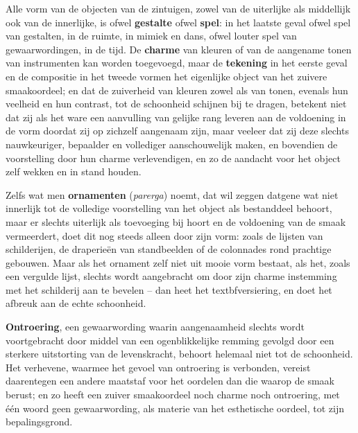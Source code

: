Alle vorm van de objecten van de zintuigen, zowel van de uiterlijke als middellijk ook van de innerlijke, is ofwel \textbf{gestalte} ofwel \textbf{spel}: in het laatste geval ofwel spel van gestalten, in de ruimte, in mimiek en dans, ofwel louter spel van gewaarwordingen, in de tijd. De \textbf{charme} van kleuren of van de aangename tonen van instrumenten kan worden toegevoegd, maar de \textbf{tekening} in het eerste geval en de compositie in het tweede vormen het eigenlijke object van het zuivere smaakoordeel; en dat de zuiverheid van kleuren zowel als van tonen, evenals hun veelheid en hun contrast, tot de schoonheid schijnen bij te dragen, betekent niet dat zij als het ware een aanvulling van gelijke rang leveren aan de voldoening in de vorm doordat zij op zichzelf aangenaam zijn, maar veeleer dat zij deze slechts nauwkeuriger, bepaalder en vollediger aanschouwelijk maken, en bovendien de voorstelling door hun charme verlevendigen, en zo de aandacht voor het object zelf wekken en in stand houden.

Zelfs wat men \textbf{ornamenten} (\emph{parerga}) noemt, dat wil zeggen datgene wat niet innerlijk tot de volledige voorstelling van het object als bestanddeel behoort, maar er slechts uiterlijk als toevoeging bij hoort en de voldoening van de smaak vermeerdert, doet dit nog steeds alleen door zijn vorm: zoals de lijsten van schilderijen, de draperieën van standbeelden of de colonnades rond prachtige gebouwen. Maar als het ornament zelf niet uit mooie vorm bestaat, als het, zoals een vergulde lijst, slechts wordt aangebracht om door zijn charme instemming met het schilderij aan te bevelen -- dan heet het textbf{versiering}, en doet het afbreuk aan de echte schoonheid.

\textbf{Ontroering}, een gewaarwording waarin aangenaamheid slechts wordt voortgebracht door middel van een ogenblikkelijke remming gevolgd door een sterkere uitstorting van de levenskracht, behoort helemaal niet tot de schoonheid. Het verhevene, waarmee het gevoel van ontroering is verbonden, vereist daarentegen een andere maatstaf voor het oordelen dan die waarop de smaak berust; en zo heeft een zuiver smaakoordeel noch charme noch ontroering, met één woord geen gewaarwording, als materie van het esthetische oordeel, tot zijn bepalingsgrond.

